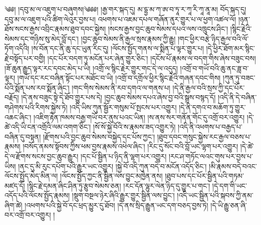 ༄༅། །དབུ་མ་ལ་འཇུག་པ་བཞུགས།༄༅༅།    །རྒྱ་གར་སྐད་དུ། མ་དྷྱ་མ་ཀ་ཨ་བ་ཏཱ་ར་ཀཱ་རི་ཀཱ་ནཱ་མ། བོད་སྐད་དུ། དབུ་མ་ལ་འཇུག་པའི་ཚིག་ལེའུར་བྱས་པ། འཕགས་པ་འཇམ་དཔལ་གཞོན་ནུར་གྱུར་པ་ལ་ཕྱག་འཚལ་ལོ། །ཉན་ཐོས་སངས་རྒྱས་འབྲིང་རྣམས་ཐུབ་དབང་སྐྱེས། །སངས་རྒྱས་བྱང་ཆུབ་སེམས་དཔའ་ལས་འཁྲུངས་ཤིང་། །སྙིང་རྗེའི་སེམས་དང་གཉིས་སུ་མེད་བློ་དང་། །བྱང་ཆུབ་སེམས་ནི་རྒྱལ་སྲས་རྣམས་ཀྱི་རྒྱུ། །གང་ཕྱིར་བརྩེ་ཉིད་རྒྱལ་བའི་ལོ་ཏོག་འདིའི། །ས་བོན་དང་ནི་ཆུ་དང་ཡུན་རིང་དུ། །ལོངས་སྤྱོད་གནས་ལ་སྨིན་པ་ལྟར་གྱུར་པ། །དེ་ཕྱིར་ཐོག་མར་སྙིང་རྗེ་བསྟོད་པར་བགྱི། །དང་པོར་བདག་ཏུ་མངོན་པར་ཞེན་གྱུར་ཅིང་། །དངོས་པོ་རྣམས་ལ་བདག་གིས་ཞེས་བཟུང་བས། །ཟོ་ཆུན་རྒྱུད་ལྟར་རང་དབང་མེད་པ་ཡི། །འགྲོ་ལ་སྙིང་རྗེར་གྱུར་གང་དེ་ལ་འདུད། །འགྲོ་བ་གཡོ་བའི་ཆུ་ནང་ཟླ་བ་ལྟར། །གཡོ་དང་རང་བཞིན་སྟོང་པར་མཐོང་བ་ཡི། །འགྲོ་བ་དགྲོལ་ཕྱིར་སྙིང་རྗེའི་གཞན་དབང་གིས། །ཀུན་ཏུ་བཟང་པོའི་སྨོན་པས་རབ་སྨོན་ཞིང་། །གང་གིས་སེམས་ནི་རབ་དགའ་ལ་གནས་པ། །དེ་ནི་རྒྱལ་བའི་སྲས་ཀྱི་དང་པོར་བརྗོད། །དེ་ནས་བཟུང་སྟེ་དེ་ཐོབ་གྱུར་པས་དེ། །བྱང་ཆུབ་སེམས་དཔའ་ཞེས་བྱ་བའི་སྒྲས་བསྙད་དོ། །འདི་ནི་དེ་བཞིན་གཤེགས་པའི་རིགས་སྐྱེས་ཏེ། །འདི་ཡིས་ཀུན་སྦྱོར་གསུམ་པོ་སྤངས་པར་འགྱུར། །དེ་ནི་དགའ་བ་མཆོག་ཏུ་གྱུར་འཆང་ཞིང་། །འཇིག་རྟེན་ཁམས་བརྒྱ་གཡོ་བར་ནུས་པའང་ཡིན། །ས་ནས་སར་གནོན་གོང་དུ་འགྲོ་བར་འགྱུར། །དེ་ཚེ་འདི་ཡི་ངན་འགྲོའི་ལམ་འགག་ཅིང་། །སོ་སོ་སྐྱེ་བོའི་ས་རྣམས་ཟད་འགྱུར་ཏེ། །འདི་ནི་འཕགས་པ་བརྒྱད་པ་བཞིན་དུ་བསྟན། །རྫོགས་པའི་བྱང་ཆུབ་སེམས་བསྐྱེད་དང་པོས་ཀྱང་། །ཐུབ་དབང་གསུང་སྐྱེས་རང་རྒྱལ་བཅས་པ་རྣམས། །བསོད་ནམས་སྟོབས་ཀྱིས་ཕམ་བྱས་རྣམས་འཕེལ་ཞིང་། །རིང་དུ་སོང་བའི་བློ་ཡང་ལྷག་པར་འགྱུར། །དེ་ཚེ་དེ་ལ་རྫོགས་སངས་བྱང་ཆུབ་རྒྱུར། །དང་པོ་སྦྱིན་པ་ཉིད་ནི་ལྷག་པར་འགྱུར། །རང་ཤ་གཏོང་ལའང་གུས་པར་བྱས་པ་ཡིས། །ནང་དུ་མི་རུང་དཔོག་པའི་རྒྱུར་ཡང་འགྱུར། །སྐྱེ་བོ་འདི་ཀུན་བདེ་བ་མངོན་འདོད་ཅིང་། །མི་རྣམས་བདེ་བའང་ལོངས་སྤྱོད་མེད་མིན་ལ། །ལོངས་སྤྱོད་ཀྱང་ནི་སྦྱིན་ལས་བྱུང་མཁྱེན་ནས། །ཐུབ་པས་དང་པོར་སྦྱིན་པའི་གཏམ་མཛད་དོ། །སྙིང་རྗེ་དམན་ཞིང་ཤིན་ཏུ་རྩུབ་སེམས་ཅན། །རང་དོན་ལྷུར་ལེན་ཉིད་དུ་གྱུར་པ་གང་། །དེ་དག་གི་ཡང་འདོད་པའི་ལོངས་སྤྱོད་རྣམས། །སྡུག་བསྔལ་ཉེར་ཞིའི་རྒྱུར་གྱུར་སྦྱིན་ལས་བྱུང་། །འདི་ཡང་སྦྱིན་པའི་སྐབས་ཀྱི་ནམ་ཞིག་ཚེ། །འཕགས་པའི་སྐྱེ་བོ་དང་ཕྲད་མྱུར་དུ་ཐོབ། །དེ་ནས་སྲིད་རྒྱུན་ཡང་དག་བཅད་བྱས་ཏེ། །དེ་ཡི་རྒྱུ་ཅན་ཞི་བར་འགྲོ་བར་འགྱུར། །
